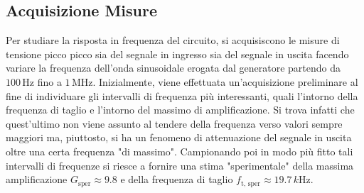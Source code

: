\documentclass[a4paper,11pt]{article} %
\begin{document}
\subsection{Acquisizione Misure}

Per studiare la risposta in frequenza del circuito, si acquisiscono le misure di tensione picco picco sia del segnale in
ingresso sia del segnale in uscita facendo variare la frequenza dell'onda sinusoidale erogata dal generatore partendo da
$100\,\si{\Hz}$ fino a $1\,\si{\MHz}$. Inizialmente, viene effettuata un'acquisizione preliminare al fine di individuare
gli intervalli di frequenza più interessanti, quali l'intorno della frequenza di taglio e l'intorno del massimo di
amplificazione. Si trova infatti che quest'ultimo non viene assunto al tendere della frequenza verso valori sempre
maggiori ma, piuttosto, si ha un fenomeno di attenuazione del segnale in uscita oltre una certa frequenza "di massimo".
Campionando poi in modo più fitto tali intervalli di frequenze si riesce a fornire una stima "sperimentale" della massima
amplificazione $G_{\text{sper}}\approx 9.8$ e della frequenza di taglio $f_{\text{t, sper}}\approx 19.7\,\si{k\Hz}$.




\end{document}
